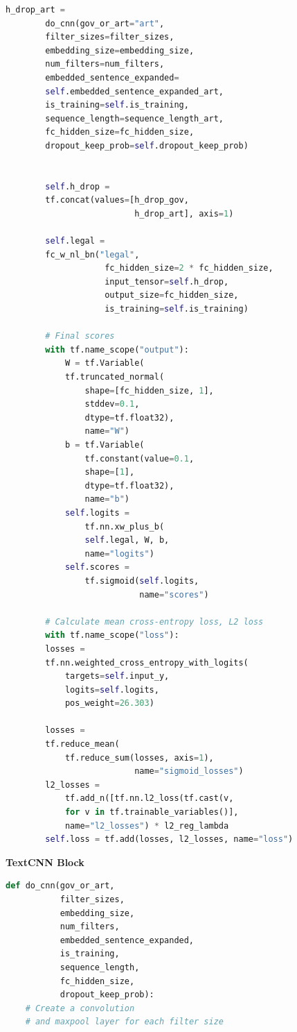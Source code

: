 \documentclass[sigconf]{acmart}
\begin{document}
\begin{appendices}
\begin{lstlisting}[breaklines, language=Python, frame=tlrb]
        h_drop_art = 
        do_cnn(gov_or_art="art",
        filter_sizes=filter_sizes,
        embedding_size=embedding_size,
        num_filters=num_filters,
        embedded_sentence_expanded=
        self.embedded_sentence_expanded_art,
        is_training=self.is_training,
        sequence_length=sequence_length_art,
        fc_hidden_size=fc_hidden_size,
        dropout_keep_prob=self.dropout_keep_prob)


        self.h_drop = 
        tf.concat(values=[h_drop_gov,
                          h_drop_art], axis=1)

        self.legal = 
        fc_w_nl_bn("legal",
                    fc_hidden_size=2 * fc_hidden_size,
                    input_tensor=self.h_drop,
                    output_size=fc_hidden_size,
                    is_training=self.is_training)

        # Final scores
        with tf.name_scope("output"):
            W = tf.Variable(
            tf.truncated_normal(
                shape=[fc_hidden_size, 1], 
                stddev=0.1,
                dtype=tf.float32),
                name="W")
            b = tf.Variable(
                tf.constant(value=0.1,
                shape=[1],
                dtype=tf.float32),
                name="b")
            self.logits = 
                tf.nn.xw_plus_b(
                self.legal, W, b,
                name="logits")
            self.scores = 
                tf.sigmoid(self.logits,
                           name="scores")

        # Calculate mean cross-entropy loss, L2 loss
        with tf.name_scope("loss"):
        losses =
        tf.nn.weighted_cross_entropy_with_logits(
            targets=self.input_y,
            logits=self.logits,
            pos_weight=26.303)

        losses = 
        tf.reduce_mean(
            tf.reduce_sum(losses, axis=1),
                          name="sigmoid_losses")
        l2_losses = 
            tf.add_n([tf.nn.l2_loss(tf.cast(v,                             tf.float32))
            for v in tf.trainable_variables()],
            name="l2_losses") * l2_reg_lambda
        self.loss = tf.add(losses, l2_losses, name="loss")
\end{lstlisting}
\textbf{TextCNN Block}
\begin{lstlisting}[language=Python, frame=tlrb]
def do_cnn(gov_or_art,
           filter_sizes,
           embedding_size,
           num_filters,
           embedded_sentence_expanded,
           is_training,
           sequence_length,
           fc_hidden_size,
           dropout_keep_prob):
    # Create a convolution 
    # and maxpool layer for each filter size
    

\end{lstlisting}
\end{appendices}
\end{document}
